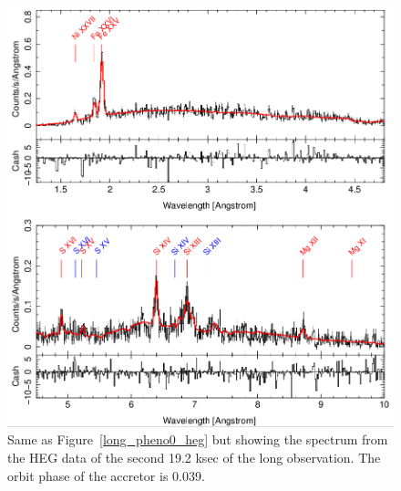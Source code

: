 \begin{figure}[t]
    \centering
        \includegraphics[width = \linewidth]{Chapters/Figures/long_pheno1_heg.png}
        \caption{Same as Figure~\ref{long_pheno0_heg} but showing the spectrum from the HEG data of the second 19.2 ksec of the long observation. The orbit phase of the accretor is 0.039.}
    \label{long_pheno1_heg}
\end{figure}


